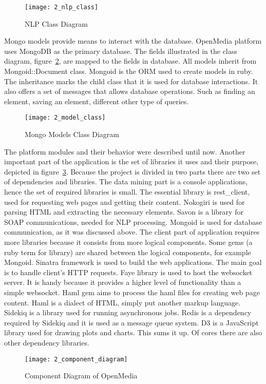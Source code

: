 \begin{figure}[!h]
\centering
\texttt{[image: 2\_nlp\_class]}
\caption{NLP Class Diagram}\label{nlp_class}
\end{figure}

Mongo models provide means to interact with the database. OpenMedia platform uses MongoDB as the primary database. The fields illustrated in the class diagram, \mbox{figure \ref{model_class}}, are mapped to the fields in database. All models inherit from Mongoid::Document class. Mongoid is the ORM used to create models in ruby. The inheritance marks the child class that it is used for database interactions. It also offers a set of messages that allows database operations. Such as finding an element, saving an element, different other type of queries.

\begin{figure}[!h]
\centering
\texttt{[image: 2\_model\_class]}
\caption{Mongo Models Class Diagram}\label{model_class}
\end{figure}

The platform modules and their behavior were described until now. Another important part of the application is the set of libraries it uses and their purpose, depicted in \mbox{figure \ref{component_diagram}}. Because the project is divided in two parts there are two set of dependencies and libraries. The data mining part is a console applications, hence the set of required libraries is small. The essential library is rest\_client, used for requesting web pages and getting their content. Nokogiri is used for parsing HTML and extracting the necessary elements. Savon is a library for SOAP communications, needed for NLP processing. Mongoid is used for database communication, as it was discussed above. The client part of application requires more libraries because it consists from more logical components. Some gems (a ruby term for library) are shared between the logical components, for example Mongoid. Sinatra framework is used to build the web applications. The main goal is to handle client's HTTP requests. Faye library is used to host the websocket server. It is handy because it provides a higher level of functionality than a simple websocket. Haml gem aims to process the haml files for creating web page content. Haml is a dialect of HTML, simply put another markup language. Sidekiq is a library used for running asynchronous jobs. Redis is a dependency required by Sidekiq and it is used as a message queue system. D3 is a JavaScript library used for drawing plots and charts. This sums it up. Of cores there are also other dependency libraries.
\begin{figure}[!h]
\centering
\texttt{[image: 2\_component\_diagram]}
\caption{Component Diagram of OpenMedia}\label{component_diagram}
\end{figure}

